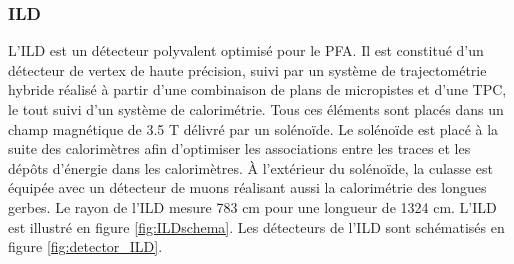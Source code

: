 %   
%   
%   
%   
%   
%   
%   
  
  \subsubsection{ILD}
  
  L'ILD est un d\'etecteur polyvalent optimis\'e pour le PFA. Il est constitu\'e d'un d\'etecteur de vertex de haute pr\'ecision, suivi par un syst\`eme de trajectom\'etrie hybride r\'ealis\'e \`a partir d'une combinaison de plans de micropistes et d'une TPC, le tout suivi d'un système de calorim\'etrie. Tous ces \'el\'ements sont plac\'es dans un champ magn\'etique de 3.5 T d\'elivr\'e par un sol\'eno\"ide. Le sol\'eno\"ide est plac\'e à la suite des calorim\`etres afin d'optimiser les associations entre les traces et les d\'ep\^ots d'\'energie dans les calorim\`etres. \`A l'ext\'erieur du sol\'eno\"ide, la culasse est \'equip\'ee avec un d\'etecteur de muons réalisant aussi la calorim\'etrie des longues gerbes. Le rayon de l'ILD mesure 783 cm pour une longueur de 1324 cm. L'ILD est illustr\'e en figure \ref{fig:ILDschema}. Les d\'etecteurs de l'ILD sont sch\'ematis\'es en figure \ref{fig:detector_ILD}.
  
